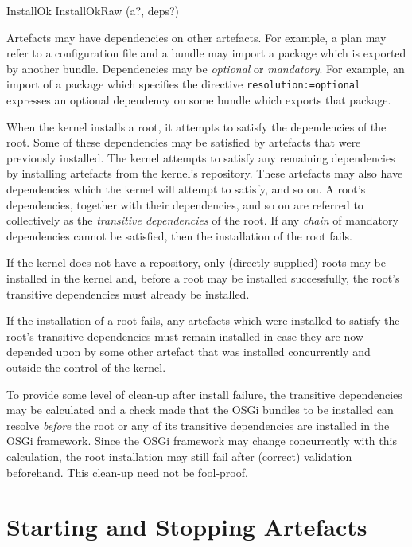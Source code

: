 \documentclass[a4paper,12pt]{article}
\begin{document}
\begin{zed}
InstallOk  InstallOkRaw \hide (a?, deps?)
\end{zed}

Artefacts may have dependencies on other artefacts.
For example, a plan may refer to a configuration file and a bundle may import a package which
is exported by another bundle.
Dependencies may be \textit{optional} or \textit{mandatory}.
For example, an import of a package which specifies the directive \texttt{resolution:=optional}
expresses an optional dependency on some bundle which exports that package.

When the kernel installs a root, it attempts to satisfy the dependencies of the root.
Some of these dependencies may be satisfied by artefacts that were previously installed.
The kernel attempts to satisfy any remaining dependencies by installing artefacts
from the kernel's repository.
These artefacts may also have dependencies which the kernel will attempt to satisfy, and so on.
A root's dependencies, together with their dependencies, and so on are referred to collectively
as the \textit{transitive dependencies} of the root. 
If any \textit{chain} of mandatory dependencies cannot be satisfied, then the installation of the
root fails.

If the kernel does not have a repository, only (directly supplied) roots may be installed in the kernel and, before a root may be installed successfully, the root's transitive dependencies must already be installed.

If the installation of a root fails, any artefacts which were installed to satisfy the root's transitive dependencies must remain installed in case they are now depended upon by some other artefact
that was installed concurrently and outside the control of the kernel.

To provide some level of clean-up after install failure, the transitive dependencies may be calculated and a check made that the OSGi bundles to be installed can resolve \textit{before} the root or any of its transitive dependencies are installed in the OSGi framework.
Since the OSGi framework may change concurrently with this calculation, the root installation
may still fail after (correct) validation beforehand.
This clean-up need not be fool-proof.

\clearpage
\section{Starting and Stopping Artefacts}
\end{document}
